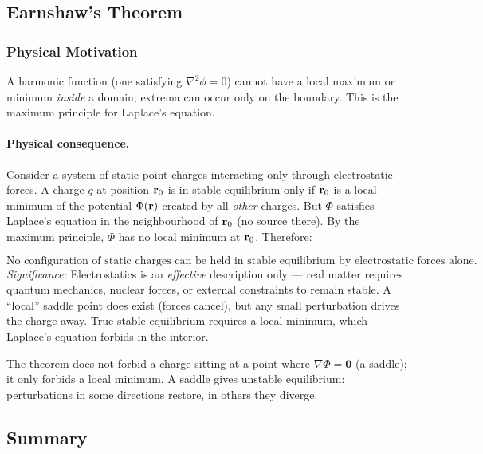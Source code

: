 \subsection{Earnshaw's Theorem}\label{subsec:lec12-earnshaw}

\subsubsection*{Physical Motivation}
A harmonic function (one satisfying $\nabla^2\phi = 0$) cannot have a local maximum or
minimum \emph{inside} a domain; extrema can occur only on the boundary.  This is the
maximum principle for Laplace's equation.

\paragraph{Physical consequence.}
Consider a system of static point charges interacting only through electrostatic forces.
A charge $q$ at position $\mathbf{r}_0$ is in stable equilibrium only if $\mathbf{r}_0$ is a local
minimum of the potential $\Phi(\mathbf{r})$ created by all \emph{other} charges.  But $\Phi$
satisfies Laplace's equation in the neighbourhood of $\mathbf{r}_0$ (no source there).  By the
maximum principle, $\Phi$ has no local minimum at $\mathbf{r}_0$.  Therefore:

\begin{equation}\label{eq:lec12:earnshaw}
  \boxed{
    \text{No configuration of static charges can be held in stable equilibrium}
    \text{ by electrostatic forces alone.}
  }
\end{equation}
\textit{Significance:} Electrostatics is an \emph{effective} description only — real
matter requires quantum mechanics, nuclear forces, or external constraints to remain stable.
A ``local'' saddle point does exist (forces cancel), but any small perturbation drives the
charge away.  True stable equilibrium requires a local minimum, which Laplace's equation
forbids in the interior.

\begin{remark}
  The theorem does not forbid a charge sitting at a point where $\nabla\Phi = \mathbf{0}$
  (a saddle); it only forbids a local minimum.  A saddle gives unstable equilibrium:
  perturbations in some directions restore, in others they diverge.
\end{remark}

\subsection{Summary}\label{subsec:lec12-summary}

